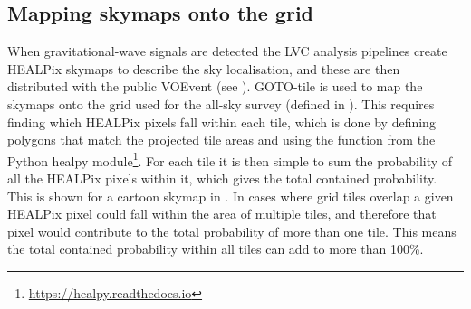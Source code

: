 \begin{colsection}
\begin{colsection}
\makeatletter
\setlength{\@fptop}{0\p@ \@plus 1fil} %
\makeatother

\end{colsection}


\newpage
\subsection{Mapping skymaps onto the grid}
\label{sec:mapping_skymaps}
\begin{colsection}

When gravitational-wave signals are detected the LVC analysis pipelines create HEALPix skymaps to describe the sky localisation, and these are then distributed with the public VOEvent (see ). GOTO-tile is used to map the skymaps onto the grid used for the all-sky survey (defined in ). This requires finding which HEALPix pixels fall within each tile, which is done by defining polygons that match the projected tile areas and using the  function from the Python healpy module\footnote{\url{https://healpy.readthedocs.io}}. For each tile it is then simple to sum the probability of all the HEALPix pixels within it, which gives the total contained probability. This is shown for a cartoon skymap in . In cases where grid tiles overlap a given HEALPix pixel could fall within the area of multiple tiles, and therefore that pixel would contribute to the total probability of more than one tile. This means the total contained probability within all tiles can add to more than 100\%.


\end{colsection}
\end{colsection}
